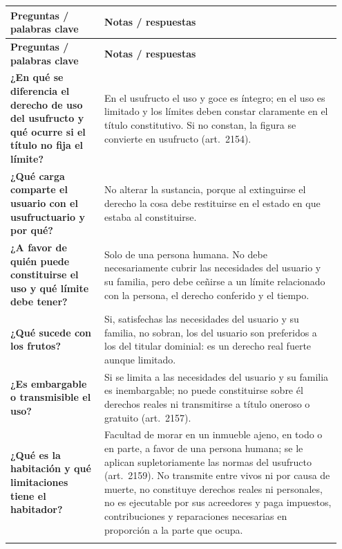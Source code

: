 \documentclass[12pt,oneside]{book}
\makeatletter
\newenvironment{cornell}{%
    \par\vspace{0.5em}
    \noindent
    \begin{longtable}{@{}>{\raggedright\arraybackslash}p{0.27\linewidth}
                         >{\raggedright\arraybackslash}p{0.68\linewidth}@{}}
    \toprule
    \textbf{Preguntas / palabras clave} & \textbf{Notas / respuestas} \\
    \midrule
    \endfirsthead
    \toprule
    \textbf{Preguntas / palabras clave} & \textbf{Notas / respuestas} \\
    \midrule
    \endhead
}{%
    \bottomrule
    \end{longtable}
}
\newcommand{\cornellsummary}[1]{%
    \midrule
    \multicolumn{2}{@{}p{\dimexpr0.95\linewidth+2\tabcolsep\relax}@{}}{%
        \vspace{0.2em}\textbf{Resumen:} #1\vspace{0.2em}} \\
}
\makeatother
\begin{document}
\begin{cornell}
\textbf{¿En qué se diferencia el derecho de uso del usufructo y qué ocurre si el título no fija el límite?} &
En el usufructo el uso y goce es íntegro; en el uso es limitado y los límites deben constar claramente en el título constitutivo. Si no constan, la figura se convierte en usufructo (art.~2154). \\

\textbf{¿Qué carga comparte el usuario con el usufructuario y por qué?} &
No alterar la sustancia, porque al extinguirse el derecho la cosa debe restituirse en el estado en que estaba al constituirse. \\

\textbf{¿A favor de quién puede constituirse el uso y qué límite debe tener?} &
Solo de una persona humana. No debe necesariamente cubrir las necesidades del usuario y su familia, pero debe ceñirse a un límite relacionado con la persona, el derecho conferido y el tiempo. \\

\textbf{¿Qué sucede con los frutos?} &
Si, satisfechas las necesidades del usuario y su familia, no sobran, los del usuario son preferidos a los del titular dominial: es un derecho real fuerte aunque limitado. \\

\textbf{¿Es embargable o transmisible el uso?} &
Si se limita a las necesidades del usuario y su familia es inembargable; no puede constituirse sobre él derechos reales ni transmitirse a título oneroso o gratuito (art.~2157). \\

\textbf{¿Qué es la habitación y qué limitaciones tiene el habitador?} &
Facultad de morar en un inmueble ajeno, en todo o en parte, a favor de una persona humana; se le aplican supletoriamente las normas del usufructo (art.~2159). No transmite entre vivos ni por causa de muerte, no constituye derechos reales ni personales, no es ejecutable por sus acreedores y paga impuestos, contribuciones y reparaciones necesarias en proporción a la parte que ocupa. \\

\cornellsummary{El uso es un derecho de usar y gozar de cosa ajena de manera limitada; el límite debe constar en el título, pues de lo contrario la figura se convierte en usufructo. Se constituye a favor de personas humanas, no es transmisible y, si se limita a las necesidades del usuario y su familia, es inembargable. La habitación otorga la facultad de morar en un inmueble ajeno, en todo o en parte, con limitaciones de transmisión, constitución de derechos y ejecución, y con obligación de afrontar gastos en proporción a la parte ocupada.}
\end{cornell}
\end{document}
